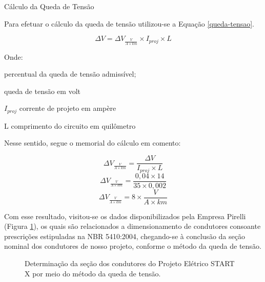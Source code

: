 \begin{description}

\item Cálculo da Queda de Tensão
	
	Para efetuar o cálculo da queda de tensão utilizou-se a Equação \ref{queda-tensao}.

\begin{equation}
	\Delta V = \Delta V_{\frac{V}{A \times km}} \times I_{proj} \times L
	\label{queda-tensao}
\end{equation}

Onde:

\begin{description}
	\item [$\Delta V$] percentual da queda de tensão admissível;
	\item [$\Delta V_{\frac{V}{A \times km}}$] queda de tensão em volt
	\item $I_{proj}$ corrente de projeto em ampère
	\item L comprimento do circuito em quilômetro
\end{description}

Nesse sentido, segue o memorial do cálculo em comento:

\begin{equation}
	\Delta V_{\frac{V}{A \times km}} = \frac{\Delta V} {I_{proj} \times L}
\end{equation}
\begin{equation}
	\Delta V_{\frac{V}{A \times km}} = \frac{0,04 \times 14}{35 \times 0,002}
\end{equation}
\begin{equation}
	\Delta V_{\frac{V}{A \times km}} = 8 \times \frac{V}{A \times km}
\end{equation}

\end{description}

Com esse resultado, visitou-se os dados disponibilizados pela Empresa Pirelli (Figura \ref{determinacao-secao}), os quais são relacionados a dimensionamento de condutores consoante prescrições estipuladas na NBR 5410:2004, chegando-se à conclusão da seção nominal dos condutores de nosso projeto, conforme o método da queda de tensão.

\begin{figure}[h]
	\centering
	\caption{ Determinação da seção dos condutores do Projeto Elétrico START X por meio do método da queda de tensão.}
	\label{determinacao-secao}
\end{figure}

